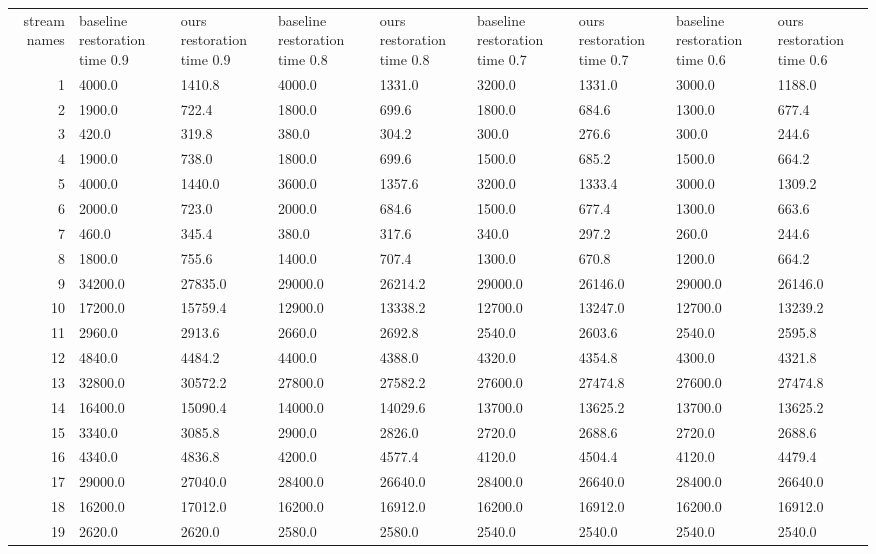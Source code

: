 \begin{tabular}{|r|l|l|l|l|l|l|l|l|}
  \hline
  stream names & baseline restoration time 0.9 & ours restoration time 0.9 & baseline restoration time 0.8 & ours restoration time 0.8 & baseline restoration time 0.7 & ours restoration time 0.7 & baseline restoration time 0.6 & ours restoration time 0.6 \\ 
  1 & 4000.0 & 1410.8 & 4000.0 & 1331.0 & 3200.0 & 1331.0 & 3000.0 & 1188.0 \\ 
  2 & 1900.0 & 722.4 & 1800.0 & 699.6 & 1800.0 & 684.6 & 1300.0 & 677.4 \\ 
  3 & 420.0 & 319.8 & 380.0 & 304.2 & 300.0 & 276.6 & 300.0 & 244.6 \\ 
  4 & 1900.0 & 738.0 & 1800.0 & 699.6 & 1500.0 & 685.2 & 1500.0 & 664.2 \\ 
  5 & 4000.0 & 1440.0 & 3600.0 & 1357.6 & 3200.0 & 1333.4 & 3000.0 & 1309.2 \\ 
  6 & 2000.0 & 723.0 & 2000.0 & 684.6 & 1500.0 & 677.4 & 1300.0 & 663.6 \\ 
  7 & 460.0 & 345.4 & 380.0 & 317.6 & 340.0 & 297.2 & 260.0 & 244.6 \\ 
  8 & 1800.0 & 755.6 & 1400.0 & 707.4 & 1300.0 & 670.8 & 1200.0 & 664.2 \\ 
  9 & 34200.0 & 27835.0 & 29000.0 & 26214.2 & 29000.0 & 26146.0 & 29000.0 & 26146.0 \\ 
  10 & 17200.0 & 15759.4 & 12900.0 & 13338.2 & 12700.0 & 13247.0 & 12700.0 & 13239.2 \\ 
  11 & 2960.0 & 2913.6 & 2660.0 & 2692.8 & 2540.0 & 2603.6 & 2540.0 & 2595.8 \\ 
  12 & 4840.0 & 4484.2 & 4400.0 & 4388.0 & 4320.0 & 4354.8 & 4300.0 & 4321.8 \\ 
  13 & 32800.0 & 30572.2 & 27800.0 & 27582.2 & 27600.0 & 27474.8 & 27600.0 & 27474.8 \\ 
  14 & 16400.0 & 15090.4 & 14000.0 & 14029.6 & 13700.0 & 13625.2 & 13700.0 & 13625.2 \\ 
  15 & 3340.0 & 3085.8 & 2900.0 & 2826.0 & 2720.0 & 2688.6 & 2720.0 & 2688.6 \\ 
  16 & 4340.0 & 4836.8 & 4200.0 & 4577.4 & 4120.0 & 4504.4 & 4120.0 & 4479.4 \\ 
  17 & 29000.0 & 27040.0 & 28400.0 & 26640.0 & 28400.0 & 26640.0 & 28400.0 & 26640.0 \\ 
  18 & 16200.0 & 17012.0 & 16200.0 & 16912.0 & 16200.0 & 16912.0 & 16200.0 & 16912.0 \\ 
  19 & 2620.0 & 2620.0 & 2580.0 & 2580.0 & 2540.0 & 2540.0 & 2540.0 & 2540.0 \\ 

\end{tabular}
